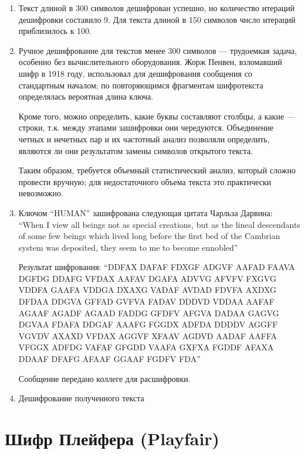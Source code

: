 \documentclass[a4paper, 14pt]{extarticle}
\begin{document}
\begin{enumerate}
    \item Текст длиной в 300 символов дешифрован успешно, но количество итераций дешифровки составило 9. Для текста длиной в 150 символов число итераций приблизилось к 100.

    \item Ручное дешифрование для текстов менее 300 символов --- трудоемкая задача, особенно без вычислительного оборудования. Жорж Пенвен, взломавший шифр в 1918 году, использовал для дешифрования сообщения со стандартным началом; по повторяющимся фрагментам шифротекста определялась вероятная длина ключа.
    
    Кроме того, можно определить, какие буквы составляют столбцы, а какие --- строки, т.к. между этапами зашифровки они чередуются. Объединение четных и нечетных пар и их частотный анализ позволяли определить, являются ли они результатом замены символов открытого текста.
    
    Таким образом, требуется объемный статистический анализ, который сложно провести вручную; для недостаточного объема текста это практически невозможно.

    \item Ключом ``HUMAN'' зашифрована следующая цитата Чарльза Дарвина:
    ``When I view all beings not as special creations, but as the lineal descendants of some few beings which lived long before the first bed of the Cambrian system was deposited, they seem to me to become ennobled''

    Результат шифрования: ``DDFAX DAFAF FDXGF ADGVF AAFAD FAAVA DGFDG DDAFG VFDAX AAFAV DGAFA ADVVG AFVFV FXGVG VDDFA GAAFA VDDGA DXAXG VADAF AVDAD FDVFA AXDXG DFDAA DDGVA GFFAD GVFVA FADAV DDDVD VDDAA AAFAF AGAAF AGADF AGAAD FADDG GFDFV AFGVA DADAA GAGVG DGVAA FDAFA DDGAF AAAFG FGGDX ADFDA DDDDV AGGFF VGVDV AXAXD VFDAX AGGVF XFAAV AGDVD AADAF AAFFA VFGGX ADFDG VAFAF GFGDD VAAFA GXFXA FGDDF AFAXA DDAAF DFAFG AFAAF GGAAF FGDFV FDA''

    Сообщение передано коллеге для расшифровки.

    \item Дешифрование полученного текста
        
    \lipsum[1] %

\end{enumerate}

\FloatBarrier{}
\section{Шифр Плейфера (Playfair)}
\end{document}
